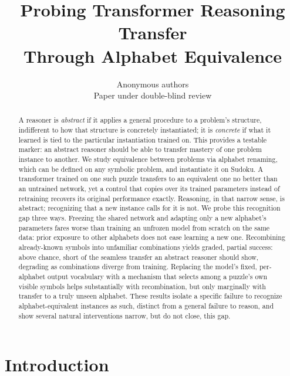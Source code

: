 \documentclass{article} %
\title{Probing Transformer Reasoning Transfer \\
Through Alphabet Equivalence}
\author{Anonymous authors \\ Paper under double-blind review}
\begin{document}
\maketitle

\begin{abstract}
A reasoner is \emph{abstract} if it applies a general procedure to a problem's structure, indifferent to how that structure is concretely instantiated; it is \emph{concrete} if what it learned is tied to the particular instantiation trained on. This provides a testable marker: an abstract reasoner should be able to transfer mastery of one problem instance to another. We study equivalence between problems via alphabet renaming, which can be defined on any symbolic problem, and instantiate it on Sudoku. A transformer trained on one such puzzle transfers to an equivalent one no better than an untrained network, yet a control that copies over its trained parameters instead of retraining recovers its original performance exactly. Reasoning, in that narrow sense, is abstract; recognizing that a new instance calls for it is not. We probe this recognition gap three ways. Freezing the shared network and adapting only a new alphabet's parameters fares worse than training an unfrozen model from scratch on the same data: prior exposure to other alphabets does not ease learning a new one. Recombining already-known symbols into unfamiliar combinations yields graded, partial success: above chance, short of the seamless transfer an abstract reasoner should show, degrading as combinations diverge from training. Replacing the model's fixed, per-alphabet output vocabulary with a mechanism that selects among a puzzle's own visible symbols helps substantially with recombination, but only marginally with transfer to a truly unseen alphabet. These results isolate a specific failure to recognize alphabet-equivalent instances as such, distinct from a general failure to reason, and show several natural interventions narrow, but do not close, this gap.
\end{abstract}

\section{Introduction}
\end{document}
